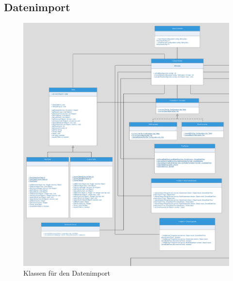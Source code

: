 \subsection{Datenimport}
\begin{figure}[!h]
\centering
\includegraphics[scale=0.6]{uml/screenshots/upload-2}
\caption{Klassen für den Datenimport}
\end{figure}
\clearpage


\clearpage

\clearpage

\clearpage


\clearpage

\clearpage

\clearpage


\clearpage

\clearpage

\clearpage

\clearpage


\clearpage
